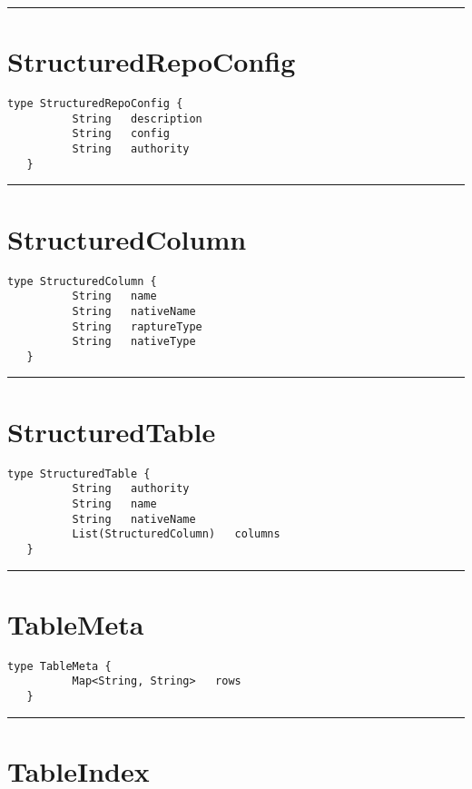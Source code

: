 \rule{12cm}{2pt}
\section{StructuredRepoConfig}
\label{type:StructuredRepoConfig}

\begin{lstlisting}[style=nonumbers]
   type StructuredRepoConfig {
          String   description
          String   config
          String   authority
   }
\end{lstlisting}

\rule{12cm}{2pt}
\section{StructuredColumn}
\label{type:StructuredColumn}

\begin{lstlisting}[style=nonumbers]
   type StructuredColumn {
          String   name
          String   nativeName
          String   raptureType
          String   nativeType
   }
\end{lstlisting}

\rule{12cm}{2pt}
\section{StructuredTable}
\label{type:StructuredTable}

\begin{lstlisting}[style=nonumbers]
   type StructuredTable {
          String   authority
          String   name
          String   nativeName
          List(StructuredColumn)   columns
   }
\end{lstlisting}

\rule{12cm}{2pt}
\section{TableMeta}
\label{type:TableMeta}

\begin{lstlisting}[style=nonumbers]
   type TableMeta {
          Map<String, String>   rows
   }
\end{lstlisting}

\rule{12cm}{2pt}
\section{TableIndex}
\label{type:TableIndex}

